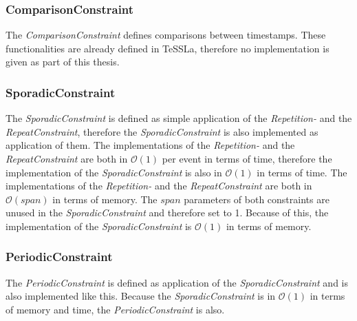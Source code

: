 \subsubsection{ComparisonConstraint}
	The \emph{ComparisonConstraint} defines comparisons between timestamps. These functionalities are already defined in TeSSLa, therefore no implementation is given as part of this thesis.  
	
\subsubsection{SporadicConstraint}
	The \emph{SporadicConstraint} is defined as simple application of the \emph{Repetition-} and the \emph{RepeatConstraint}, therefore the \emph{SporadicConstraint} is also implemented as application of them. The implementations of the \emph{Repetition-} and the \emph{RepeatConstraint} are both in $\mathcal{O}(1)$ per event in terms of time, therefore the implementation of the \emph{SporadicConstraint} is also in  $\mathcal{O}(1)$ in terms of time. The implementations of the \emph{Repetition-} and the \emph{RepeatConstraint} are both in $\mathcal{O}(span)$ in terms of memory. The $span$ parameters of both constraints are unused in the \emph{SporadicConstraint} and therefore set to 1. Because of this, the implementation of the \emph{SporadicConstraint} is $\mathcal{O}(1)$ in terms of memory.
	
\subsubsection{PeriodicConstraint}
	The \emph{PeriodicConstraint} is defined as application of the \emph{SporadicConstraint} and is also implemented like this. Because the \emph{SporadicConstraint} is in $\mathcal{O}(1)$ in terms of memory and time, the \emph{PeriodicConstraint} is also.
	
